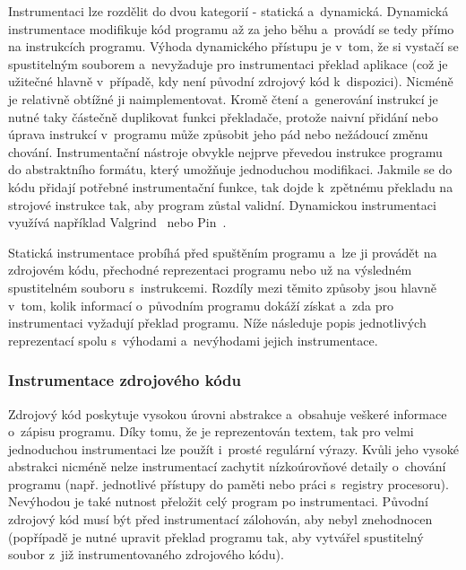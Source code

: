 Instrumentaci lze rozdělit do dvou kategorií - statická a~dynamická. Dynamická instrumentace modifikuje kód programu až za jeho běhu a~provádí se tedy přímo na instrukcích programu. Výhoda dynamického přístupu je v~tom, že si vystačí se spustitelným souborem a~nevyžaduje pro instrumentaci překlad aplikace (což je užitečné hlavně v~případě, kdy není původní zdrojový kód k~dispozici). Nicméně je relativně obtížné ji naimplementovat. Kromě čtení a~generování instrukcí je nutné taky částečně duplikovat funkci překladače, protože naivní přidání nebo úprava instrukcí v~programu může způsobit jeho pád nebo nežádoucí změnu chování. Instrumentační nástroje obvykle nejprve převedou instrukce programu do abstraktního formátu, který umožňuje jednoduchou modifikaci. Jakmile se do kódu přidají potřebné instrumentační funkce, tak dojde k~zpětnému překladu na strojové instrukce tak, aby program zůstal validní.
Dynamickou instrumentaci využívá například Valgrind~\cite{valgrind} nebo Pin~\cite{pin}.

Statická instrumentace probíhá před spuštěním programu a~lze ji provádět na zdrojovém kódu, přechodné reprezentaci programu nebo už na výsledném spustitelném souboru s~instrukcemi. Rozdíly mezi těmito způsoby jsou hlavně v~tom, kolik informací o~původním programu dokáží získat a~zda pro instrumentaci vyžadují překlad programu. Níže následuje popis jednotlivých reprezentací spolu s~výhodami a~nevýhodami jejich instrumentace.

\subsubsection*{Instrumentace zdrojového kódu}
Zdrojový kód poskytuje vysokou úrovni abstrakce a~obsahuje veškeré informace o~zápisu programu. Díky tomu, že je reprezentován textem, tak pro velmi jednoduchou instrumentaci lze použít i~prosté regulární výrazy. Kvůli jeho vysoké abstrakci nicméně nelze instrumentací zachytit nízkoúrovňové detaily o~chování programu (např. jednotlivé přístupy do paměti nebo práci s~registry procesoru). Nevýhodou je také nutnost přeložit celý program po instrumentaci. Původní zdrojový kód musí být před instrumentací zálohován, aby nebyl znehodnocen (popřípadě je nutné upravit překlad programu tak, aby vytvářel spustitelný soubor z~již instrumentovaného zdrojového kódu).

